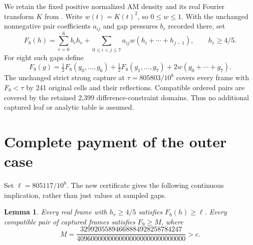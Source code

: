 \documentclass[11pt]{article}
\newtheorem{lemma}[theorem]{Lemma}
\begin{document}
We retain the fixed positive normalized AM density and its real
Fourier transform $K$ from \cite{Joint}. Write $w(t)=K(t)^2$, so
$0\le w\le1$. With the unchanged nonnegative pair coefficients
$a_{ij}$ and gap pressures $b_r$ recorded there, set
\[
 F_8(h)=\sum_{r=0}^6b_rh_r+
 \sum_{0\le i<j\le7}a_{ij}w(h_i+\cdots+h_{j-1}),
 \qquad h_r\ge4/5.
\]
For eight such gaps define
\[
 F_9(g)=\tfrac12F_8(g_0,\ldots,g_6)
       +\tfrac12F_8(g_1,\ldots,g_7)
       +2w(g_0+\cdots+g_7).
\]
The unchanged strict strong capture at
$\tau=805803/10^8$ covers every frame with $F_8<\tau$ by 241
original cells and their reflections. Compatible ordered pairs
are covered by the retained 2,399 difference-constraint domains.
Thus no additional captured leaf or analytic table is assumed.

\section{Complete payment of the outer case}
Set $\ell=805117/10^8$. The new certificate gives the following
continuous implication, rather than just values at sampled gaps.
\begin{lemma}\label{lem:frame}
Every real frame with $h_r\ge4/5$ satisfies $F_8(h)\ge\ell$.
Every compatible pair of captured frames satisfies $F_9\ge M$, where
\[
 M=\frac{32992055894668884928258784247}
          {4096000000000000000000000000000}>c.
\]
\end{lemma}
\end{document}
